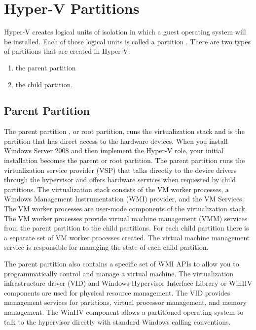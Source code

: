 \vspace{5mm}
\section{Hyper-V Partitions}
\vspace{5mm}

Hyper-V creates logical units of isolation in which a guest operating system will be installed. Each of those logical units is called a partition . There are two types of 
partitions that are created in Hyper-V:
\vspace{5mm}
\begin{enumerate}
	\item the parent partition 
	\item the child partition.
\end{enumerate}

\vspace{5mm}
\subsection{Parent Partition}
\vspace{5mm}

The parent partition \cite{BOOK:1}, or root partition, runs the virtualization stack and is the partition that has direct access to the hardware devices. When you install Windows Server
2008 and then implement the Hyper-V role, your initial installation becomes the parent or root partition. The parent partition runs the virtualization service provider (VSP) that talks
directly to the device drivers through the hypervisor and offers hardware services when requested by child partitions. The virtualization stack consists of the VM worker processes,
a Windows Management Instrumentation (WMI) provider, and the VM Services. The VM worker processes are user-mode components of the virtualization stack.
The VM worker processes provide virtual machine management (VMM) services from the parent partition to the child partitions. For each child partition there is a separate set of VM worker processes created. The virtual machine management service is responsible for managing the state of each child partition.

\vspace{5mm}

The parent partition also contains a specific set of WMI APIs to allow you to programmatically control and manage a virtual machine. The virtualization infrastructure driver
(VID) and Windows Hypervisor Interface Library or WinHV components are used for physical resource management. The VID provides management services for partitions, virtual processor management, and memory management. The WinHV component allows a partitioned operating system to talk to the hypervisor directly with standard Windows calling conventions.

